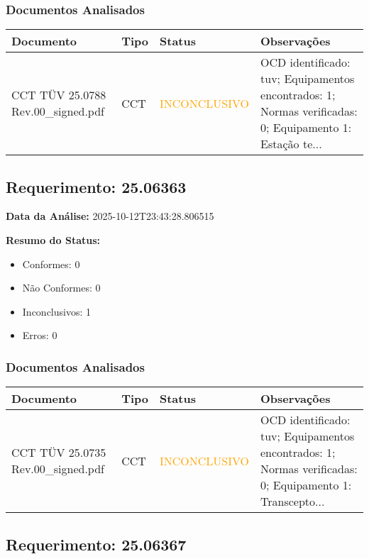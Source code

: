 \documentclass[12pt,a4paper]{article}
\begin{document}
\subsubsection{Documentos Analisados}

\begin{longtable}{|p{4cm}|p{2cm}|p{2cm}|p{6cm}|}
\hline
\textbf{Documento} & \textbf{Tipo} & \textbf{Status} & \textbf{Observações} \\
\hline
\endhead
CCT TÜV 25.0788 Rev.00\_signed.pdf & CCT & \textcolor{orange}{INCONCLUSIVO} & OCD identificado: tuv; Equipamentos encontrados: 1; Normas verificadas: 0; Equipamento 1: Estação te... \\
\hline
\end{longtable}


\subsection{Requerimento: 25.06363}

\textbf{Data da Análise:} 2025-10-12T23:43:28.806515

\textbf{Resumo do Status:}
\begin{itemize}
    \item Conformes: 0
    \item Não Conformes: 0
    \item Inconclusivos: 1
    \item Erros: 0
\end{itemize}

\subsubsection{Documentos Analisados}

\begin{longtable}{|p{4cm}|p{2cm}|p{2cm}|p{6cm}|}
\hline
\textbf{Documento} & \textbf{Tipo} & \textbf{Status} & \textbf{Observações} \\
\hline
\endhead
CCT TÜV 25.0735 Rev.00\_signed.pdf & CCT & \textcolor{orange}{INCONCLUSIVO} & OCD identificado: tuv; Equipamentos encontrados: 1; Normas verificadas: 0; Equipamento 1: Transcepto... \\
\hline
\end{longtable}


\subsection{Requerimento: 25.06367}
\end{document}

